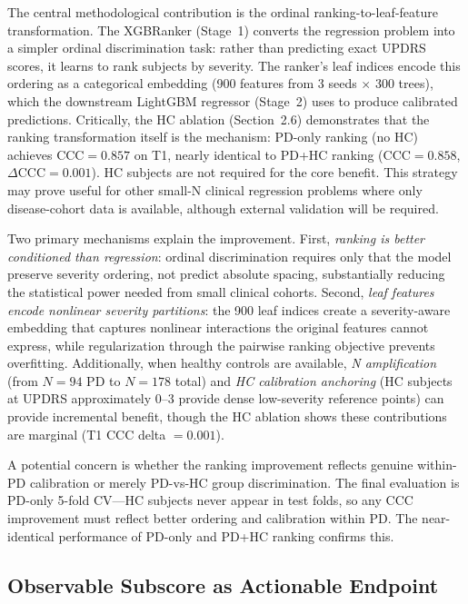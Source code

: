 \documentclass[11pt,a4paper]{article}
\begin{document}
The central methodological contribution is the ordinal ranking-to-leaf-feature transformation. The XGBRanker (Stage~1) converts the regression problem into a simpler ordinal discrimination task: rather than predicting exact UPDRS scores, it learns to rank subjects by severity. The ranker's leaf indices encode this ordering as a categorical embedding (900 features from 3 seeds $\times$ 300 trees), which the downstream LightGBM regressor (Stage~2) uses to produce calibrated predictions. Critically, the HC ablation (Section~2.6) demonstrates that the ranking transformation itself is the mechanism: PD-only ranking (no HC) achieves $\mathrm{CCC}=0.857$ on T1, nearly identical to PD+HC ranking ($\mathrm{CCC}=0.858$, $\Delta\mathrm{CCC}=0.001$). HC subjects are not required for the core benefit. This strategy may prove useful for other small-N clinical regression problems where only disease-cohort data is available, although external validation will be required.

Two primary mechanisms explain the improvement. First, \emph{ranking is better conditioned than regression}: ordinal discrimination requires only that the model preserve severity ordering, not predict absolute spacing, substantially reducing the statistical power needed from small clinical cohorts. Second, \emph{leaf features encode nonlinear severity partitions}: the 900 leaf indices create a severity-aware embedding that captures nonlinear interactions the original features cannot express, while regularization through the pairwise ranking objective prevents overfitting. Additionally, when healthy controls are available, \emph{N amplification} (from $N=94$ PD to $N=178$ total) and \emph{HC calibration anchoring} (HC subjects at UPDRS approximately 0--3 provide dense low-severity reference points) can provide incremental benefit, though the HC ablation shows these contributions are marginal (T1 CCC delta $=0.001$).

A potential concern is whether the ranking improvement reflects genuine within-PD calibration or merely PD-vs-HC group discrimination. The final evaluation is PD-only 5-fold CV---HC subjects never appear in test folds, so any CCC improvement must reflect better ordering and calibration within PD. The near-identical performance of PD-only and PD+HC ranking confirms this.

\subsection{Observable Subscore as Actionable Endpoint}
\end{document}
